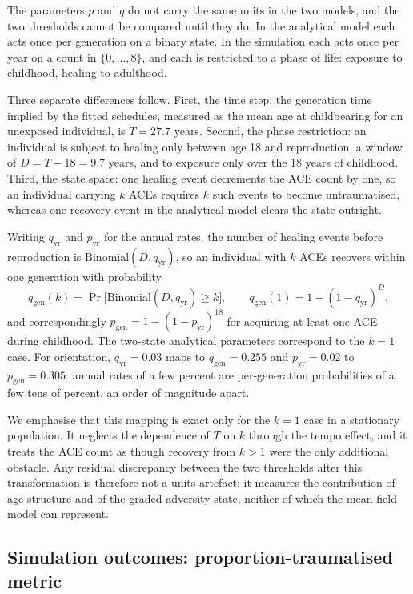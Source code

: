 \documentclass{article}
\begin{document}
The parameters \(p\) and \(q\) do not carry the same units in the two models,
and the two thresholds cannot be compared until they do.  In the analytical
model each acts once per generation on a binary state.  In the simulation each
acts once per year on a count in \(\{0,\dots,8\}\), and each is restricted to a
phase of life: exposure to childhood, healing to adulthood.

Three separate differences follow.  First, the time step: the generation time
implied by the fitted schedules, measured as the mean age at childbearing for an
unexposed individual, is \(T=27.7\) years.  Second, the phase restriction: an
individual is subject to healing only between age 18 and reproduction, a window
of \(D=T-18=9.7\) years, and to exposure only over the 18 years of childhood.
Third, the state space: one healing event decrements the ACE count by one, so an
individual carrying \(k\) ACEs requires \(k\) such events to become
untraumatised, whereas one recovery event in the analytical model clears the
state outright.

Writing \(q_{\mathrm{yr}}\) and \(p_{\mathrm{yr}}\) for the annual rates, the
number of healing events before reproduction is
\(\mathrm{Binomial}(D, q_{\mathrm{yr}})\), so an individual with \(k\) ACEs
recovers within one generation with probability
\[
    q_{\mathrm{gen}}(k)=\Pr\bigl[\mathrm{Binomial}(D,q_{\mathrm{yr}})\ge k\bigr],
    \qquad
    q_{\mathrm{gen}}(1)=1-(1-q_{\mathrm{yr}})^{D},
\]
and correspondingly
\(p_{\mathrm{gen}}=1-(1-p_{\mathrm{yr}})^{18}\) for acquiring at least one ACE
during childhood.  The two-state analytical parameters correspond to the
\(k=1\) case.  For orientation, \(q_{\mathrm{yr}}=0.03\) maps to
\(q_{\mathrm{gen}}=0.255\) and \(p_{\mathrm{yr}}=0.02\) to
\(p_{\mathrm{gen}}=0.305\): annual rates of a few percent are per-generation
probabilities of a few tens of percent, an order of magnitude apart.

We emphasise that this mapping is exact only for the \(k=1\) case in a
stationary population.  It neglects the dependence of \(T\) on \(k\) through the
tempo effect, and it treats the ACE count as though recovery from \(k>1\) were
the only additional obstacle.  Any residual discrepancy between the two
thresholds after this transformation is therefore not a units artefact: it
measures the contribution of age structure and of the graded adversity state,
neither of which the mean-field model can represent.

\subsection{Simulation outcomes: proportion-traumatised metric}
\label{si:prop-traumatised}
\end{document}
